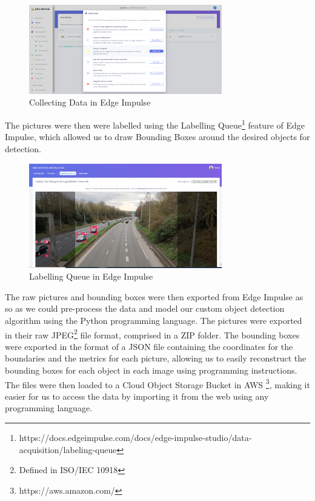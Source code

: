 \documentclass[openright]{normas-utf-tex} %
\begin{document}
\begin{figure}[H]
	\centering
	\includegraphics[width=0.75\textwidth]{./images/edge-impulse-collect-data.png}
	\caption[Collecting Data in Edge Impulse]{Collecting Data in Edge Impulse}
    \label{fig:diff}
\end{figure}

The pictures were then were labelled using the Labelling Queue\footnote{https://docs.edgeimpulse.com/docs/edge-impulse-studio/data-acquisition/labeling-queue}
feature of Edge Impulse, which allowed us to draw Bounding Boxes around the desired objects for detection.

\begin{figure}[H]
	\centering
	\includegraphics[width=0.75\textwidth]{./images/edge-impulse-labelling-queue.png}
	\caption[Labelling Queue in Edge Impulse]{Labelling Queue in Edge Impulse}
    \label{fig:diff}
\end{figure}

The raw pictures and bounding boxes were then exported from Edge Impulse as so as
we could pre-process the data and model our custom object detection algorithm using the 
Python programming language.
The pictures were exported in their raw JPEG\footnote{Defined in ISO/IEC 10918}  file format, 
comprised in a ZIP folder.
The bounding boxes were exported in the format of a JSON file containing the coordinates for the boundaries
and the metrics for each picture, allowing us to easily reconstruct the bounding boxes for each object 
in each image using programming instructions. The files were then loaded to a Cloud Object Storage Bucket in AWS
\footnote{https://aws.amazon.com/}, making it easier for us to access the data by importing it from 
the web using any programming language.
\end{document}
